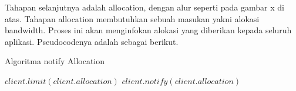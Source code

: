         Tahapan selanjutnya adalah allocation, dengan alur seperti pada gambar x di atas. Tahapan allocation membutuhkan sebuah masukan yakni alokasi bandwidth. Proses ini akan menginfokan alokasi 
        yang diberikan kepada seluruh aplikasi. Pseudocodenya adalah sebagai berikut.

        \begin{algorithm}[tbh]
        \caption{Algoritma notify Allocation}\label{alg:notifyAllocation}
        \begin{algorithmic}[1]
        \State $client.limit(client.allocation)$
        \State $client.notify(client.allocation)$
        \EndFor
        \end{algorithmic}
        \end{algorithm}






